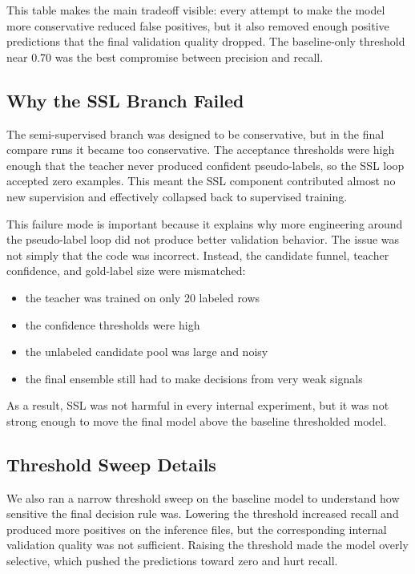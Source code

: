 \documentclass[journal]{IEEEtran}
\begin{document}
This table makes the main tradeoff visible: every attempt to make the model more conservative reduced false positives, but it also removed enough positive predictions that the final validation quality dropped. The baseline-only threshold near 0.70 was the best compromise between precision and recall.

\subsection{Why the SSL Branch Failed}

The semi-supervised branch was designed to be conservative, but in the final compare runs it became too conservative. The acceptance thresholds were high enough that the teacher never produced confident pseudo-labels, so the SSL loop accepted zero examples. This meant the SSL component contributed almost no new supervision and effectively collapsed back to supervised training.

This failure mode is important because it explains why more engineering around the pseudo-label loop did not produce better validation behavior. The issue was not simply that the code was incorrect. Instead, the candidate funnel, teacher confidence, and gold-label size were mismatched:
\begin{itemize}
    \item the teacher was trained on only 20 labeled rows
    \item the confidence thresholds were high
    \item the unlabeled candidate pool was large and noisy
    \item the final ensemble still had to make decisions from very weak signals
\end{itemize}

As a result, SSL was not harmful in every internal experiment, but it was not strong enough to move the final model above the baseline thresholded model.

\subsection{Threshold Sweep Details}

We also ran a narrow threshold sweep on the baseline model to understand how sensitive the final decision rule was. Lowering the threshold increased recall and produced more positives on the inference files, but the corresponding internal validation quality was not sufficient. Raising the threshold made the model overly selective, which pushed the predictions toward zero and hurt recall.
\end{document}
